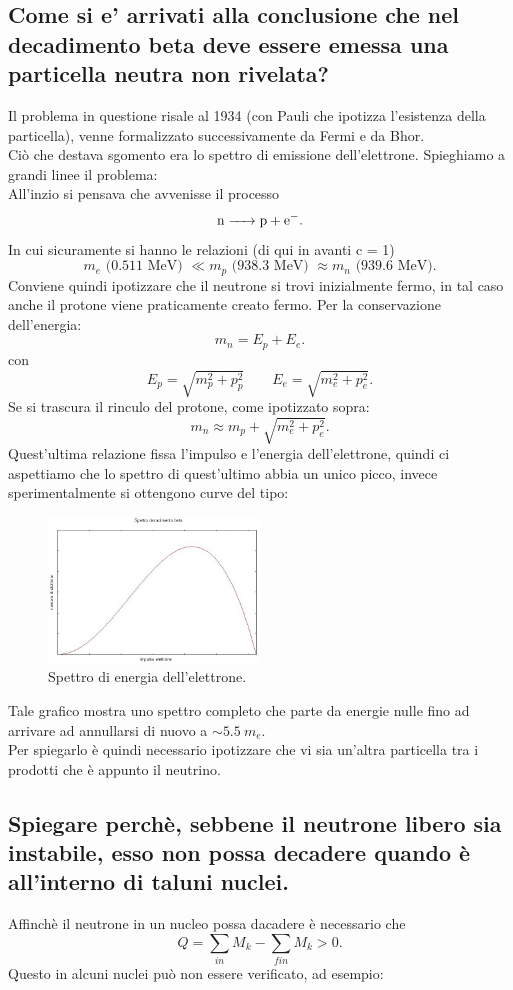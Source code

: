 \subsection[]{ Come si e' arrivati alla conclusione che nel decadimento beta deve essere emessa una particella neutra non rivelata? }
Il problema in questione risale al 1934 (con Pauli che ipotizza l'esistenza della particella), venne formalizzato successivamente da Fermi e da Bhor.\\
Ciò che destava sgomento era lo spettro di emissione dell'elettrone. Spieghiamo a grandi linee il problema: \\
All'inzio si pensava che avvenisse il processo
\[
	\ce{n -> p + e-}
.\] 
In cui sicuramente si hanno le relazioni (di qui in avanti c = 1) 
\[
	m_e \text{ (0.511 MeV) }\ll m_p \text{ (938.3 MeV) } \approx m_n \text{ (939.6 MeV)}
.\] 
Conviene quindi ipotizzare che il neutrone si trovi inizialmente fermo, in tal caso anche il protone viene praticamente creato fermo. Per la conservazione dell'energia:
\[
	m_n =E_p + E_e
.\]
con 
\[
	E_p = \sqrt{m_p^2 + p_p^2} \quad \quad 
	E_e = \sqrt{m_e^2 + p_e^2} 
.\]
Se si trascura il rinculo del protone, come ipotizzato sopra:
\[
	m_n \approx m_p + \sqrt{m_e^2 + p_e^2} 
.\]
Quest'ultima relazione fissa l'impulso e l'energia dell'elettrone, quindi ci aspettiamo che lo spettro di quest'ultimo abbia un unico picco, invece sperimentalmente si ottengono curve del tipo:
\begin{figure}[H]
	\centering
	\includegraphics[width=0.5\textwidth]{immagini/Decadimento_beta_(spettro).jpg}
	\caption{Spettro di energia dell'elettrone.}
	\label{fig:beta}
\end{figure} 
Tale grafico mostra uno spettro completo che parte da energie nulle fino ad arrivare ad annullarsi di nuovo a $\sim 5.5 \ m_e$.\\
Per spiegarlo è quindi necessario ipotizzare che vi sia un'altra particella tra i prodotti che è appunto il neutrino.


\subsection[]{ Spiegare perchè, sebbene il neutrone libero sia instabile, esso non possa decadere quando è all'interno di taluni nuclei.}
Affinchè il neutrone in un nucleo possa dacadere è necessario che
\[
	Q = \sum_{in} M_k - \sum_{fin} M_k > 0
.\] 
Questo in alcuni nuclei può non essere verificato, ad esempio:
